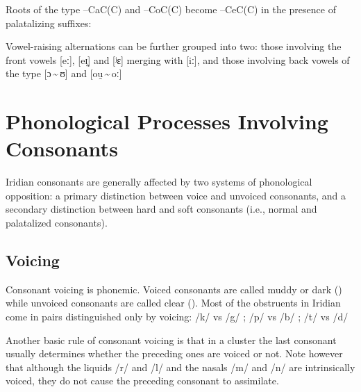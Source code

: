 Roots of the type --CaC(C) and --CoC(C) become --CeC(C) in the presence of palatalizing suffixes:

\ex
{}
\xe

Vowel-raising alternations can be further grouped into two: those involving the front vowels [eː], [eɪ̯] and [ʲɛ] merging with [iː], and those involving back vowels of the type [ɔ\,\sim\,ʊ] and [ou̯\,\sim\,oː]




\section{Phonological Processes Involving Consonants}



Iridian consonants are generally affected by two systems of phonological opposition: a primary distinction between voice and unvoiced consonants, and a secondary distinction between hard and soft consonants (i.e., normal and palatalized consonants).


\subsection{Voicing}
Consonant voicing is phonemic. Voiced consonants are called muddy or dark () while unvoiced consonants are called clear (). Most of the obstruents in Iridian come in pairs distinguished only by voicing: /k/  vs /g/ ; /p/  vs /b/ ; /t/  vs /d/  



Another basic rule of consonant voicing is that in a cluster the last consonant usually determines whether the preceding ones are voiced or not. Note however that although the liquids /r/ and /l/ and the nasals /m/ and /n/ are intrinsically voiced, they do not cause the preceding consonant to assimilate.

\ex
{}
\xe



